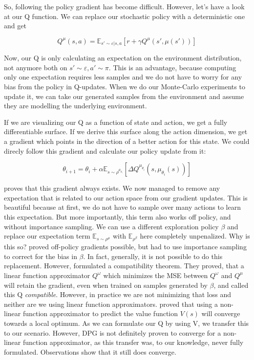 \documentclass[hyperref,german,beleg]{cgvpub}
\begin{document}
So, following the policy gradient has become difficult. However, let's have a look at our Q function. We can replace our stochastic policy with a deterministic one and get

\begin{equation}
Q^{\mu}(s,a) = \mathbb{E}_{s' \sim \varepsilon | s,a}[r + \gamma Q^{\mu}(s', \mu(s'))]
\end{equation}

Now, our Q is only calculating an expectation on the environment distribution, not anymore both on $s' \sim \varepsilon, a' \sim \pi$. This is an advantage, because computing only one expectation requires less samples and we do not have to worry for any bias from the policy in Q-updates. When we do our Monte-Carlo experiments to update it, we can take our generated samples from the environment and assume they are modelling the underlying environment.

If we are visualizing our Q as a function of state and action, we get a fully differentiable surface. If we derive this surface along the action dimension, we get a gradient which points in the direction of a better action for this state. We could direcly follow this gradient and calculate our policy update from it:

\begin{equation}
\theta_{i+1} = \theta_i + \alpha \mathbb{E}_{s \sim \rho^{\mu_{\theta_i}}}[\Delta Q^{\mu_{\theta_i}}(s, \mu_{\theta_i}(s))]
\end{equation}

\cite[Theorem 1]{silverDeterministicPolicyGradient2013} proves that this gradient always exists. We now managed to remove any expectation that is related to our action space from our gradient updates. This is beautiful because at first, we do not have to sample over many actions to learn this expectation. But more importantly, this term also works off policy, and without importance sampling. We can use a different exploration policy $\beta$ and replace our expectation term $\mathbb{E}_{s \sim \rho^{\mu}}$ with $\mathbb{E}_{\rho^{\beta}}$ here completely unpenalized. Why is this so? \cite{degrisOffPolicyActorCritic2013} proved off-policy gradients possible, but had to use importance sampling to correct for the bias in $\beta$. In fact, generally, it is not possible to do this replacement. However, \cite[Section 4.3]{silverDeterministicPolicyGradient2013} formulated a compatibility theorem. They proved, that a linear function approximator $Q^{\omega}$ which minimizes the MSE between $Q^{\omega}$ and $Q^{\mu}$ will retain the gradient, even when trained on samples generated by $\beta$, and called this Q \textit{compatible}. However, in practice we are not minimizing that loss and neither are we using linear function approximators. \cite{bhatnagarConvergentTemporalDifferenceLearning2009} proved that using a non-linear function approximator to predict the value function $V(s)$ will converge towards a local optimum. As we can formulate our Q by using V, we transfer this to our scenario. However, \ac{DPG} is not definitely proven to converge for a non-linear function approximator, as this transfer was, to our knowledge, never fully formulated. Observations show that it still does converge.
\end{document}
